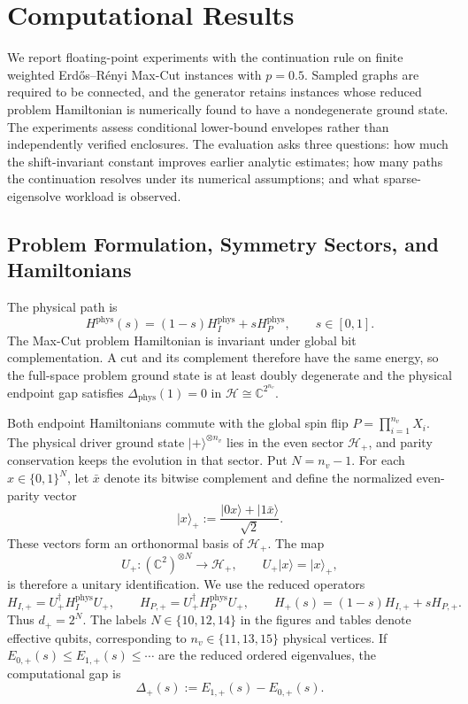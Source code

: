 \documentclass[11pt, a4paper]{article}
\newcommand{\ket}[1]{| #1 \rangle}
\begin{document}
\section{Computational Results}

We report floating-point experiments with the continuation rule on finite weighted Erd\H{o}s--R\'{e}nyi Max-Cut instances with $p=0.5$. Sampled graphs are required to be connected, and the generator retains instances whose reduced problem Hamiltonian is numerically found to have a nondegenerate ground state. The experiments assess conditional lower-bound envelopes rather than independently verified enclosures. The evaluation asks three questions: how much the shift-invariant constant improves earlier analytic estimates; how many paths the continuation resolves under its numerical assumptions; and what sparse-eigensolve workload is observed.

\subsection{Problem Formulation, Symmetry Sectors, and Hamiltonians}
The physical path is
\begin{equation}
H^{\mathrm{phys}}(s)=(1-s)H_I^{\mathrm{phys}}+sH_P^{\mathrm{phys}},
\qquad s\in[0,1].
\end{equation}
The Max-Cut problem Hamiltonian is invariant under global bit complementation. A cut and its complement therefore have the same energy, so the full-space problem ground state is at least doubly degenerate and the physical endpoint gap satisfies $\Delta_{\mathrm{phys}}(1)=0$ in $\mathcal H\cong\mathbb C^{2^{n_v}}$.

Both endpoint Hamiltonians commute with the global spin flip $P=\prod_{i=1}^{n_v}X_i$. The physical driver ground state $\ket{+}^{\otimes n_v}$ lies in the even sector $\mathcal H_+$, and parity conservation keeps the evolution in that sector. Put $N=n_v-1$. For each $x\in\{0,1\}^N$, let $\bar x$ denote its bitwise complement and define the normalized even-parity vector
\begin{equation}
\label{eq:even-basis}
\ket{x}_+:=\frac{\ket{0x}+\ket{1\bar x}}{\sqrt2}.
\end{equation}
These vectors form an orthonormal basis of $\mathcal H_+$. The map
\begin{equation}
U_+:(\mathbb C^2)^{\otimes N}\longrightarrow\mathcal H_+,
\qquad U_+\ket{x}=\ket{x}_+,
\end{equation}
is therefore a unitary identification. We use the reduced operators
\begin{equation}
H_{I,+}=U_+^\dagger H_I^{\mathrm{phys}}U_+,
\qquad
H_{P,+}=U_+^\dagger H_P^{\mathrm{phys}}U_+,
\qquad
H_+(s)=(1-s)H_{I,+}+sH_{P,+}.
\end{equation}
Thus $d_+=2^N$. The labels $N\in\{10,12,14\}$ in the figures and tables denote effective qubits, corresponding to $n_v\in\{11,13,15\}$ physical vertices. If $E_{0,+}(s)\le E_{1,+}(s)\le\cdots$ are the reduced ordered eigenvalues, the computational gap is
\begin{equation}
\Delta_+(s):=E_{1,+}(s)-E_{0,+}(s).
\end{equation}
\end{document}
